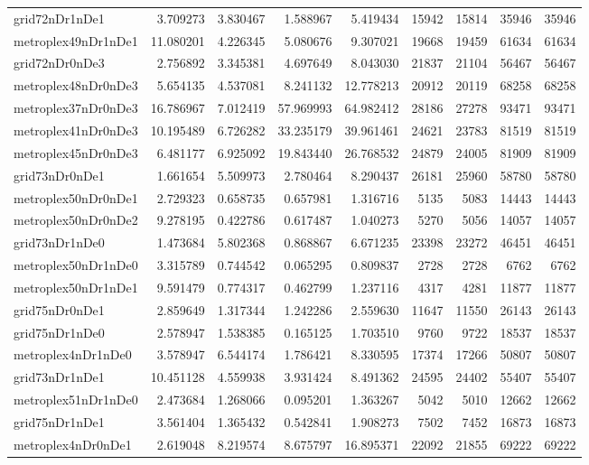 \begin{longtable}{|l|r|r|r|r|r|r|r|r|}
grid72nDr1nDe1 & 3.709273 & 3.830467 & 1.588967 & 5.419434 & 15942 & 15814 & 35946 & 35946 \\
metroplex49nDr1nDe1 & 11.080201 & 4.226345 & 5.080676 & 9.307021 & 19668 & 19459 & 61634 & 61634 \\
grid72nDr0nDe3 & 2.756892 & 3.345381 & 4.697649 & 8.043030 & 21837 & 21104 & 56467 & 56467 \\
metroplex48nDr0nDe3 & 5.654135 & 4.537081 & 8.241132 & 12.778213 & 20912 & 20119 & 68258 & 68258 \\
metroplex37nDr0nDe3 & 16.786967 & 7.012419 & 57.969993 & 64.982412 & 28186 & 27278 & 93471 & 93471 \\
metroplex41nDr0nDe3 & 10.195489 & 6.726282 & 33.235179 & 39.961461 & 24621 & 23783 & 81519 & 81519 \\
metroplex45nDr0nDe3 & 6.481177 & 6.925092 & 19.843440 & 26.768532 & 24879 & 24005 & 81909 & 81909 \\
grid73nDr0nDe1 & 1.661654 & 5.509973 & 2.780464 & 8.290437 & 26181 & 25960 & 58780 & 58780 \\
metroplex50nDr0nDe1 & 2.729323 & 0.658735 & 0.657981 & 1.316716 & 5135 & 5083 & 14443 & 14443 \\
metroplex50nDr0nDe2 & 9.278195 & 0.422786 & 0.617487 & 1.040273 & 5270 & 5056 & 14057 & 14057 \\
grid73nDr1nDe0 & 1.473684 & 5.802368 & 0.868867 & 6.671235 & 23398 & 23272 & 46451 & 46451 \\
metroplex50nDr1nDe0 & 3.315789 & 0.744542 & 0.065295 & 0.809837 & 2728 & 2728 & 6762 & 6762 \\
metroplex50nDr1nDe1 & 9.591479 & 0.774317 & 0.462799 & 1.237116 & 4317 & 4281 & 11877 & 11877 \\
grid75nDr0nDe1 & 2.859649 & 1.317344 & 1.242286 & 2.559630 & 11647 & 11550 & 26143 & 26143 \\
grid75nDr1nDe0 & 2.578947 & 1.538385 & 0.165125 & 1.703510 & 9760 & 9722 & 18537 & 18537 \\
metroplex4nDr1nDe0 & 3.578947 & 6.544174 & 1.786421 & 8.330595 & 17374 & 17266 & 50807 & 50807 \\
grid73nDr1nDe1 & 10.451128 & 4.559938 & 3.931424 & 8.491362 & 24595 & 24402 & 55407 & 55407 \\
metroplex51nDr1nDe0 & 2.473684 & 1.268066 & 0.095201 & 1.363267 & 5042 & 5010 & 12662 & 12662 \\
grid75nDr1nDe1 & 3.561404 & 1.365432 & 0.542841 & 1.908273 & 7502 & 7452 & 16873 & 16873 \\
metroplex4nDr0nDe1 & 2.619048 & 8.219574 & 8.675797 & 16.895371 & 22092 & 21855 & 69222 & 69222 \\

\end{longtable}

